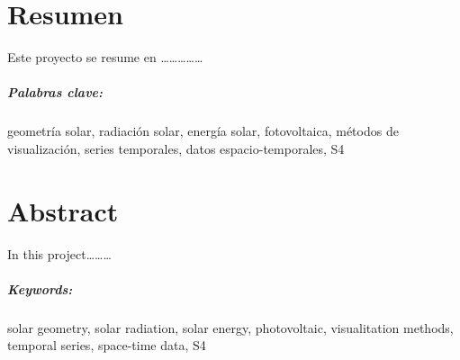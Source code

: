 \chapter{Resumen}

Este proyecto se resume en \ldots{}\ldots{}\ldots{}\ldots{}\ldots{}

\paragraph{Palabras clave:}
geometría solar, radiación solar, energía solar, fotovoltaica, métodos de visualización, series temporales, datos espacio-temporales, S4

\chapter{Abstract}

In this project\ldots{}\ldots{}\ldots{}

\paragraph{Keywords:}
solar geometry, solar radiation, solar energy, photovoltaic, visualitation methods, temporal series, space-time data, S4

